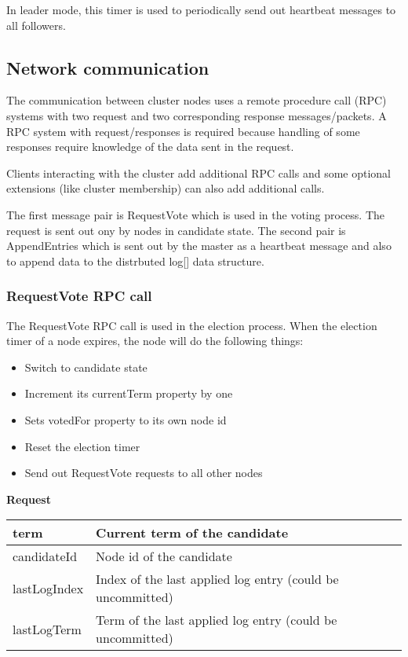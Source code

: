 In leader mode, this timer is used to periodically send out heartbeat messages to all followers.

\subsection{Network communication}

The communication between cluster nodes uses a remote procedure call (RPC) systems with two request and two corresponding response messages/packets. A RPC system with request/responses is required because handling of some responses require knowledge of the data sent in the request.

Clients interacting with the cluster add additional RPC calls and some optional extensions (like cluster membership) can also add additional calls.

The first message pair is RequestVote which is used in the voting process. The request is sent out ony by nodes in candidate state.
The second pair is AppendEntries which is sent out by the master as a heartbeat message and also to append data to the distrbuted log[] data structure.

\subsubsection*{RequestVote RPC call}
The RequestVote RPC call is used in the election process. When the election timer of a node expires, the node will do the following things:

\begin{itemize}
    \item Switch to candidate state
    \item Increment its currentTerm property by one
    \item Sets votedFor property to its own node id
    \item Reset the election timer
    \item Send out RequestVote requests to all other nodes
\end{itemize}

\textbf{Request}

\begin{tabular}{ | l | p{13.7cm} | }
\hline
term & Current term of the candidate \\ \hline
candidateId & Node id of the candidate \\ \hline
lastLogIndex & Index of the last applied log entry (could be uncommitted) \\ \hline
lastLogTerm & Term of the last applied log entry (could be uncommitted) \\ \hline
\end{tabular}

